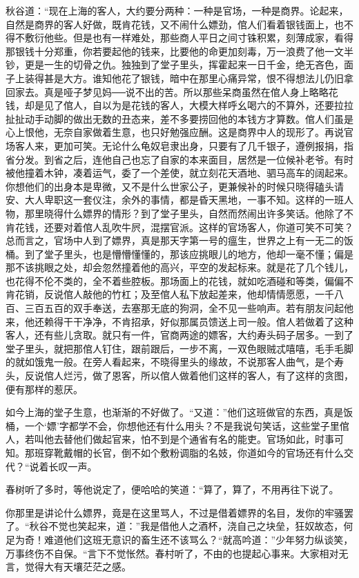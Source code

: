 \documentclass[12pt,UTF8]{ctexbook}
\begin{document}
{{{秋谷道：“现在上海的客人，大约要分两种：一种是官场，一种是商界。论起来，自然是商界的客人好做，既肯花钱，又不闹什么嫖劲，倌人们看着银钱面上，也不得不敷衍他些。但是也有一样难处，那些商人平日之间寸铢积累，刻薄成家，看得那银钱十分郑重，你若要起他的钱来，比要他的命更加刻毒，万一浪费了他一文半钞，更是一生的切骨之仇。独独到了堂子里头，挥霍起来一日千金，绝无吝色，面子上装得甚是大方。谁知他花了银钱，暗中在那里心痛异常，恨不得想法儿仍旧拿回家去。真是哑子梦见妈──说不出的苦。所以那些呆商虽然在倌人身上略略花钱，却是见了倌人，自以为是花钱的客人，大模大样呼幺喝六的不算外，还要拉拉扯扯动手动脚的做出无数的丑态来，差不多要捞回他的本钱方才算数。倌人们虽是心上恨他，无奈自家做着生意，也只好勉强应酬。这是商界中人的现形了。再说官场客人来，更加可笑。无论什么龟奴皂隶出身，只要有了几千银子，遵例报捐，指省分发。到省之后，连他自己也忘了自家的本来面目，居然是一位候补老爷。有时被他撞着木钟，凑着运气，委了一个差使，就立刻花天酒地、驷马高车的阔起来。你想他们的出身本是卑微，又不是什么世家公子，更兼候补的时候只晓得磕头请安、大人卑职这一套仪注，余外的事情，都是昏天黑地，一事不知。这样的一班人物，那里晓得什么嫖界的情形？到了堂子里头，自然而然闹出许多笑话。他除了不肯花钱，还要对着倌人乱吹牛屄，混摆官派。这样的官场客人，你道可笑不可笑？总而言之，官场中人到了嫖界，真是那天字第一号的瘟生，世界之上有一无二的饭桶。到了堂子里头，也是懵懵懂懂的，那该应挑眼儿的地方，他却一毫不懂；偏是那不该挑眼之处，却会忽然撞着他的高兴，平空的发起标来。就是花了几个钱儿，也花得不伦不类的，全不着些腔板。那场面上的花钱，就如吃酒碰和等类，偏偏不肯花销，反说倌人敲他的竹杠；及至倌人私下放起差来，他却情情愿愿，一千八百、三百五百的双手奉送，去塞那无底的狗洞，全不见一些响声。若有朋友问起他来，他还赖得干干净净，不肯招承，好似那属员馈送上司一般。倌人若做着了这种客人，还有些儿贪取。就只有一件，官商两途的嫖客，大约寿头码子居多。一到了堂子里头，就把那倌人钉住，跟前跟后，一步不离，一双色眼贼忒嘻嘻，毛手毛脚的就如饿鬼一般。在旁人看起来，不晓得里头的缘故，不说那客人曲气，是个寿头，反说倌人烂污，做了恩客，所以倌人做着他们这样的客人，有了这样的贪图，便有那样的惹厌。

如今上海的堂子生意，也渐渐的不好做了。“又道：”他们这班做官的东西，真是饭桶，一个‘嫖’字都学不会，你想他还有什么用头？不是我说句笑话，这些堂子里倌人，若叫他去替他们做起官来，怕不到是个通省有名的能吏。官场如此，时事可知。那班穿靴戴帽的长官，倒不如个敷粉调脂的名妓，你道如今的官场还有什么交代？“说着长叹一声。

春树听了多时，等他说定了，便哈哈的笑道：“算了，算了，不用再往下说了。

你那里是讲论什么嫖界，竟是在这里骂人，不过是借着嫖界的名目，发你的牢骚罢了。“秋谷不觉也笑起来，道：”我是借他人之酒杯，浇自己之块垒，狂奴故态，何足为奇！难道他们这班无意识的畜生还不该骂么？“就高吟道：”少年努力纵谈笑，万事终伤不自保。“言下不觉怅然。春村听了，不由的也提起心事来。大家相对无言，觉得大有天壤茫茫之感。

}}}
\end{document}

